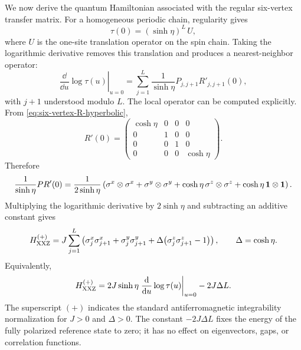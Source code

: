 We now derive the quantum Hamiltonian associated with the regular six-vertex
transfer matrix.  For a homogeneous periodic chain, regularity gives
\begin{equation}
\label{eq:six-vertex-transfer-at-zero-shift}
    \tau(0)
    =
    (\sinh\eta)^L\,U,
\end{equation}
where $U$ is the one-site translation operator on the spin chain.  Taking the
logarithmic derivative removes this translation and produces a nearest-neighbor
operator:
\begin{equation}
\label{eq:six-vertex-log-derivative-locality}
    \left.\frac{\dd}{\dd u}\log\tau(u)\right|_{u=0}
    =
    \sum_{j=1}^{L}
    \frac{1}{\sinh\eta}
    P_{j,j+1}R'_{j,j+1}(0),
\end{equation}
with $j+1$ understood modulo $L$.  The local operator can be computed explicitly.
From \cref{eq:six-vertex-R-hyperbolic},
\begin{equation}
\label{eq:six-vertex-R-prime-zero}
    R'(0)=
    \begin{pmatrix}
        \cosh\eta&0&0&0\\
        0&1&0&0\\
        0&0&1&0\\
        0&0&0&\cosh\eta
    \end{pmatrix}.
\end{equation}
Therefore
\begin{equation}
\label{eq:six-vertex-local-log-derivative-pauli}
    \frac{1}{\sinh\eta}P R'(0)
    =
    \frac{1}{2\sinh\eta}
    \left(
        \sigma^x\otimes\sigma^x
        +\sigma^y\otimes\sigma^y
        +\cosh\eta\,\sigma^z\otimes\sigma^z
        +\cosh\eta\,\mathbf{1}\otimes\mathbf{1}
    \right).
\end{equation}
Multiplying the logarithmic derivative by $2\sinh\eta$ and subtracting an
additive constant gives
\begin{equation}
\label{eq:xxz-from-six-vertex-integrability-normalization}
    H_{\rm XXZ}^{(+)}
    =
    J\sum_{j=1}^{L}
    \left(
        \sigma_j^x\sigma_{j+1}^x
        +\sigma_j^y\sigma_{j+1}^y
        +\Delta\bigl(\sigma_j^z\sigma_{j+1}^z-1\bigr)
    \right),
    \qquad
    \Delta=\cosh\eta .
\end{equation}
Equivalently,
\begin{equation}
\label{eq:xxz-hamiltonian-log-derivative-final}
    H_{\rm XXZ}^{(+)}
    =
    2J\sinh\eta
    \left.\frac{\mathrm{d}}{\mathrm{d} u}\log\tau(u)\right|_{u=0}
    -2J\Delta L .
\end{equation}
The superscript $(+)$ indicates the standard antiferromagnetic integrability
normalization for $J>0$ and $\Delta>0$.  The constant $-2J\Delta L$ fixes the
energy of the fully polarized reference state to zero; it has no effect on
eigenvectors, gaps, or correlation functions.

